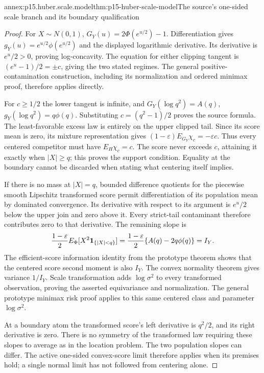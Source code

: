 \begin{annexitem}{annex:p15.huber.scale.model}{thm:p15-huber-scale-model}{The source's one-sided scale branch and its boundary qualification}
\begin{proof}
For \(X\sim N(0,1)\),
\(G_Y(u)=2\Phi(e^{u/2})-1\). Differentiation gives
\(g_Y(u)=e^{u/2}\phi(e^{u/2})\) and the displayed logarithmic
derivative. Its derivative is \(e^u/2>0\), proving log-concavity.
The equation for either clipping tangent is
\((e^u-1)/2=\pm c\), giving the two stated regimes.
The general positive-contamination construction, including its
normalization and ordered minimax proof, therefore applies directly.

For \(c\geq1/2\) the lower tangent is infinite, and
\(G_Y(\log q^2)=A(q)\), \(g_Y(\log q^2)=q\phi(q)\).
Substituting \(c=(q^2-1)/2\) proves the source formula.
The least-favorable excess law is entirely on the upper clipped
tail. Since its score mean is zero, its mixture representation
gives
\((1-\varepsilon)E_{G_Y}\chi_c=-\varepsilon c\).
Thus every centered competitor must have \(E_H\chi_c=c\).
The score never exceeds \(c\), attaining it exactly when
\(|X|\geq q\); this proves the support condition.
Equality at the boundary cannot be discarded when stating what
centering itself implies.

If there is no mass at \(|X|=q\), bounded difference quotients
for the piecewise smooth Lipschitz transformed score permit
differentiation of its population mean by dominated convergence.
Its derivative with respect to its argument is
\(e^u/2\) below the upper join and zero above it.
Every strict-tail contaminant therefore contributes zero to
that derivative. The remaining slope is
\[
 \frac{1-\varepsilon}{2}E_\Phi[X^2{\bf1}_{\{|X|<q\}}]
 =\frac{1-\varepsilon}{2}\{A(q)-2q\phi(q)\}=I_Y.
\]
The efficient-score information identity from the prototype theorem
shows that the centered score second moment is also \(I_Y\).
The convex normality theorem gives variance \(1/I_Y\).
Scale transformation adds \(\log\sigma^2\) to every transformed
observation, proving the asserted equivariance and normalization.
The general prototype minimax risk proof applies to this same
centered class and parameter \(\log\sigma^2\).

At a boundary atom the transformed score's left derivative is
\(q^2/2\), and its right derivative is zero. There is no symmetry
of the transformed law requiring these slopes to average as in
the location problem. The two population slopes can differ.
The active one-sided convex-score limit therefore applies when
its premises hold; a single normal limit has not followed from
centering alone.
\end{proof}
\end{annexitem}

